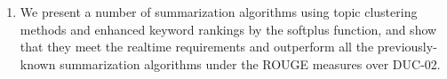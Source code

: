 \documentclass[a4paper,twoside]{article}
\begin{document}
\vspace*{-3pt}
\begin{enumerate}
\item We present a number of summarization algorithms using topic clustering methods and enhanced keyword rankings by the softplus function,
and show that they meet the realtime requirements and outperform all the previously-known summarization algorithms under
the ROUGE measures over DUC-02.
%
%



\end{enumerate}
\end{document}
